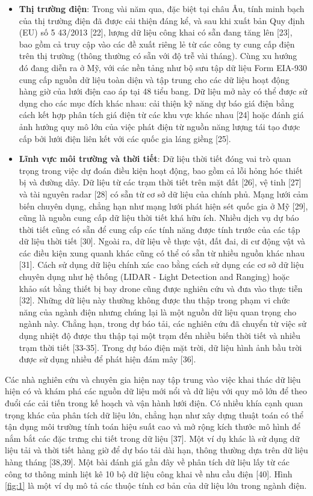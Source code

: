 \documentclass[utf8]{frontiersSCNS} %
\begin{document}
\begin{itemize}
	\item \textbf{Thị trường điện}: Trong vài năm qua, đặc biệt tại châu Âu, tính minh bạch của thị trường điện đã được cải thiện đáng kể, và sau khi xuất bản Quy định (EU) số 5 43/2013 [22], lượng dữ liệu công khai có sẵn đang tăng lên [23], bao gồm cả truy cập vào các đề xuất riêng lẻ từ các công ty cung cấp điện trên thị trường (thông thường có sẵn với độ trễ vài tháng). Cùng xu hướng đó đang diễn ra ở Mỹ, với các nền tảng như bộ sưu tập dữ liệu Form EIA-930 cung cấp nguồn dữ liệu toàn diện và tập trung cho các dữ liệu hoạt động hàng giờ của lưới điện cao áp tại 48 tiểu bang. Dữ liệu mở này có thể được sử dụng cho các mục đích khác nhau: cải thiện kỹ năng dự báo giá điện bằng cách kết hợp phân tích giá điện từ các khu vực khác nhau [24] hoặc đánh giá ảnh hưởng quy mô lớn của việc phát điện từ nguồn năng lượng tái tạo được cấp bởi lưới điện liên kết với các quốc gia láng giềng [25].
	
	\item \textbf{Lĩnh vực môi trường và thời tiết}: Dữ liệu thời tiết đóng vai trò quan trọng trong việc dự đoán điều kiện hoạt động, bao gồm cả lỗi hỏng hóc thiết bị và đường dây. Dữ liệu từ các trạm thời tiết trên mặt đất [26], vệ tinh [27] và tài nguyên radar [28] có sẵn từ cơ sở dữ liệu của chính phủ. Mạng lưới cảm biến chuyên dụng, chẳng hạn như mạng lưới phát hiện sét quốc gia ở Mỹ [29], cũng là nguồn cung cấp dữ liệu thời tiết khá hữu ích. Nhiều dịch vụ dự báo thời tiết cũng có sẵn để cung cấp các tính năng được tính trước của các tập dữ liệu thời tiết [30]. Ngoài ra, dữ liệu về thực vật, đất đai, di cư động vật và các điều kiện xung quanh khác cũng có thể có sẵn từ nhiều nguồn khác nhau [31]. Cách sử dụng dữ liệu chính xác cao bằng cách sử dụng các cơ sở dữ liệu chuyên dụng như hệ thống (LIDAR - Light Detection and Ranging) hoặc khảo sát bằng thiết bị bay drone cũng được nghiên cứu và đưa vào thực tiễn [32]. Những dữ liệu này thường không được thu thập trong phạm vi chức năng của ngành điện nhưng chúng lại là một nguồn dữ liệu quan trọng cho ngành này. Chẳng hạn, trong dự báo tải, các nghiên cứu đã chuyển từ việc sử dụng nhiệt độ được thu thập tại một trạm đến nhiều biến thời tiết và nhiều trạm thời tiết [33-35]. Trong dự báo điện mặt trời, dữ liệu hình ảnh bầu trời được sử dụng nhiều để phát hiện đám mây [36].
\end{itemize}

Các nhà nghiên cứu và chuyên gia hiện nay tập trung vào việc khai thác dữ liệu hiện có và khám phá các nguồn dữ liệu mới nổi và dữ liệu với quy mô lớn để theo đuổi các cải tiến trong kế hoạch và vận hành lưới điện. Có nhiều khía cạnh quan trọng khác của phân tích dữ liệu lớn, chẳng hạn như xây dựng thuật toán có thể tận dụng môi trường tính toán hiệu suất cao và mở rộng kích thước mô hình để nắm bắt các đặc trưng chi tiết trong dữ liệu [37]. Một ví dụ khác là sử dụng dữ liệu tải và thời tiết hàng giờ để dự báo tải dài hạn, thông thường dựa trên dữ liệu hàng tháng [38,39]. Một bài đánh giá gần đây về phân tích dữ liệu lấy từ các công tơ thông minh liệt kê 10 bộ dữ liệu công khai về nhu cầu điện [40]. Hình \ref{fig:1} là một ví dụ mô tả các thuộc tính cơ bản của dữ liệu lớn trong ngành điện.
\end{document}

